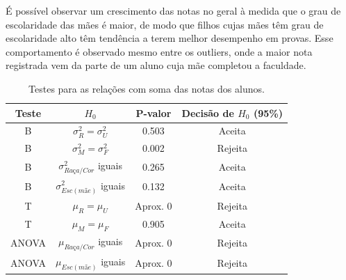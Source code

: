 É possível observar um crescimento das notas no geral à medida que o grau de escolaridade
das mães é maior, de modo que filhos cujas mães têm grau de escolaridade alto têm tendência
a terem melhor desempenho em provas. Esse comportamento é observado mesmo entre os outliers,
onde a maior nota registrada vem da parte de um aluno cuja mãe completou a faculdade.



\newpage
\begin{table}[htb]
\caption{Testes para as relações com soma
 das notas dos alunos.}
    \centering
    \begin{tabular}{cccc}
    \toprule
    Teste & $H_0$& P-valor & Decisão de $H_0$ (95\%)\\
    \midrule \midrule
    B & $\sigma_R^2 = \sigma_U^2$ & 0.503 & Aceita\\
    B & $\sigma_M^2 = \sigma_F^2$ & 0.002 & Rejeita\\
    B & $\sigma_{Raça/Cor}^2$ iguais & 0.265 & Aceita\\
    B & $\sigma_{Esc(mãe)}^2$ iguais & 0.132 & Aceita\\
    T & $\mu_R = \mu_U$ & Aprox. 0 & Rejeita\\
    T & $\mu_M = \mu_F$ & 0.905 & Aceita\\
    ANOVA & $\mu_{Raça/Cor}$ iguais & Aprox. 0 & Rejeita\\
    ANOVA & $\mu_{Esc(mãe)}$ iguais & Aprox. 0 & Rejeita\\
    \bottomrule
    \end{tabular}
\end{table}

